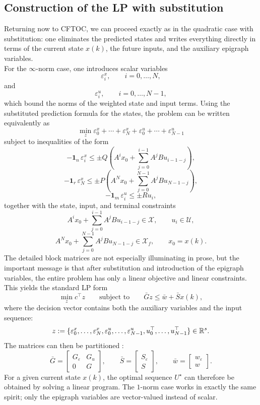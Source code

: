\subsection{Construction of the LP with substitution}

Returning now to CFTOC, we can proceed exactly as in the quadratic case with
substitution: one eliminates the predicted states and writes everything directly in terms of the
current state \(x(k)\), the future inputs, and the auxiliary epigraph variables.\\
For the \(\infty\)-norm case, one introduces scalar variables
\[
\varepsilon_i^x,\qquad i=0,\dots,N,
\]
and
\[
\varepsilon_i^u,\qquad i=0,\dots,N-1,
\]
which bound the norms of the weighted state and input terms. Using the substituted prediction
formula for the states, the problem can be written equivalently as
\[
\min_z
\varepsilon_0^x+\cdots+\varepsilon_N^x+\varepsilon_0^u+\cdots+\varepsilon_{N-1}^u
\]
subject to inequalities of the form
\[
-\mathbf 1_n\,\varepsilon_i^x
\le
\pm Q\!\left(A^i x_0+\sum_{j=0}^{i-1}A^jBu_{i-1-j}\right),
\]
\[
-\mathbf 1_r\,\varepsilon_N^x
\le
\pm P\!\left(A^N x_0+\sum_{j=0}^{N-1}A^jBu_{N-1-j}\right),
\]
\[
-\mathbf 1_m\,\varepsilon_i^u \le \pm Ru_i,
\]
together with the state, input, and terminal constraints
\[
A^i x_0+\sum_{j=0}^{i-1}A^jBu_{i-1-j}\in\mathcal X,
\qquad
u_i\in\mathcal U,
\]
\[
A^N x_0+\sum_{j=0}^{N-1}A^jBu_{N-1-j}\in\mathcal X_f,
\qquad
x_0=x(k).
\]
The detailed block matrices are not especially illuminating in prose, but the important message
is that after substitution and introduction of the epigraph variables, the entire problem has only
a linear objective and linear constraints.\\
This yields the standard LP form
\[
\min_z c^\top z
\qquad \text{subject to}\qquad
\bar G z \le \bar w + \bar S x(k),
\]
where the decision vector contains both the auxiliary variables and the input sequence:
\[
z
:=
\{\varepsilon_0^x,\dots,\varepsilon_N^x,\varepsilon_0^u,\dots,\varepsilon_{N-1}^u,
u_0^\top,\dots,u_{N-1}^\top\}\in\mathbb{R}^s.
\]
The matrices can then be partitioned :
\[
\bar G=
\begin{bmatrix}
G_\varepsilon & G_u\\
0 & G
\end{bmatrix},
\qquad
\bar S=
\begin{bmatrix}
S_\varepsilon\\
S
\end{bmatrix},
\qquad
\bar w=
\begin{bmatrix}
w_\varepsilon\\
w
\end{bmatrix}.
\]
For a given current state \(x(k)\), the optimal sequence \(U^\star\) can therefore be obtained
by solving a linear program. The \(1\)-norm case works in exactly the same spirit; only the
epigraph variables are vector-valued instead of scalar.

